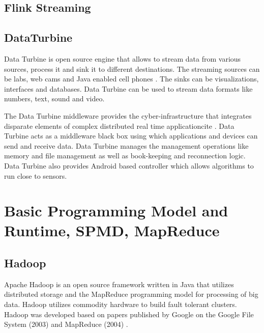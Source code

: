      \pv
     
\subsection{Flink Streaming}

\pv

\subsection{DataTurbine}

     Data Turbine is open source engine that
     allows to stream data from various sources, process it and sink
     it to different destinations. The streaming sources can be labs,
     web cams and Java enabled cell phones \cite{www-data-turbine}.
     The sinks can be
     visualizations, interfaces and databases.  Data Turbine can be
     used to stream data formats like numbers, text, sound and video.

     The Data Turbine middleware provides the cyber-infrastructure that
     integrates disparate elements of complex distributed real time
     applicationcite \cite{osdt-ecologicalsociety}. Data Turbine acts
     as a middleware black box using
     which applications and devices can send and receive data. Data
     Turbine manages the management operations like memory and file
     management as well as book-keeping and reconnection logic.  Data
     Turbine also provides Android based controller which allows
     algorithms to run close to sensors.

     \pv


\section{Basic Programming Model and Runtime, SPMD, MapReduce}
\label{S:o-prg-model}


\subsection{Hadoop}

     Apache Hadoop is an open source framework written in Java that 
     utilizes distributed storage and the MapReduce programming model 
     for processing of big data. Hadoop utilizes commodity hardware to 
     build fault tolerant clusters.  Hadoop was developed based on 
     papers published by Google on the Google File System (2003) and 
     MapReduce (2004) \cite{www-wikihadoop}.

